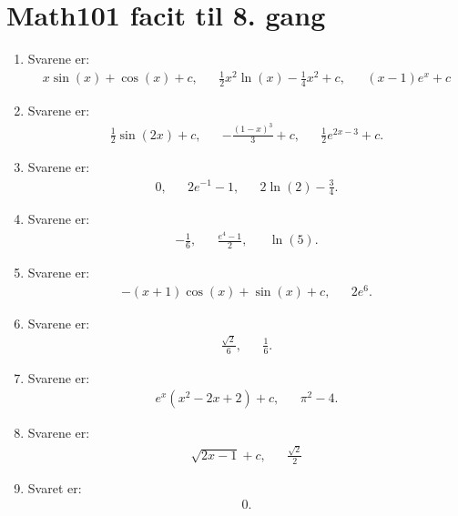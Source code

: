 \newpage
\section{Math101 facit til 8. gang}

\begin{enumerate}
	\item \label{it:int21} Svarene er:
	\begin{align*}
	x\sin(x)+\cos(x)+c,&& \frac{1}{2}x^2\ln(x)-\frac{1}{4}x^2+c,&& (x-1)e^x+c
	\end{align*}
	
	\item Svarene er:
	\begin{align*}
	\frac{1}{2}\sin(2x)+c,&& -\frac{(1-x)^3}{3}+c,&& \frac{1}{2} e^{2x-3}+c.
	\end{align*}
	
	\item Svarene er:
	\begin{align*}
	0,&& 2e^{-1}-1,&& 2\ln(2)-\frac{3}{4}.
	\end{align*}
	
	\item Svarene er:
	\begin{align*}
	-\frac{1}{6},&& \frac{e^4-1}{2},&& \ln(5).
	\end{align*}
	
	\item Svarene er:
	\begin{align*}
	-(x+1)\cos(x)+\sin(x)+c,&& 2e^{6}.
	\end{align*}
	
	\item Svarene er:
	\begin{align*}
	\frac{\sqrt{2}}{6},&& \frac{1}{6}.
	\end{align*}
	
	\item Svarene er:
	\begin{align*}
	e^x(x^2-2x+2) +c,&& \pi^2-4.
	\end{align*}
	
	\item Svarene er:
	\begin{align*}
	\sqrt{2x-1}+c,&& \frac{\sqrt{2}}{2}
	\end{align*}
	
	\item Svaret er:
	\begin{align*}
	0.
	\end{align*}
\end{enumerate}